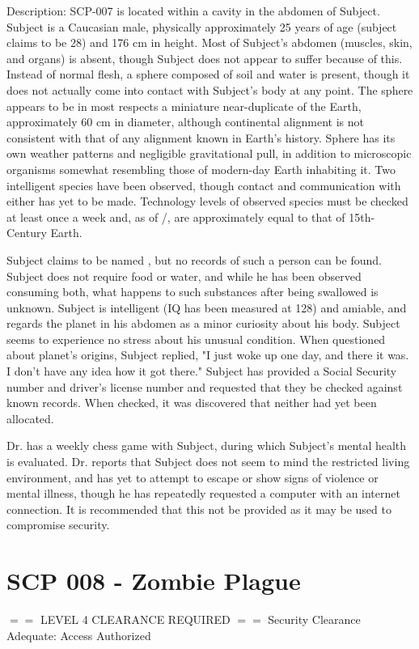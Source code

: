 \documentclass[a4paper, 11pt]{article}
\begin{document}
Description: SCP-007 is located within a cavity in the abdomen of Subject. Subject is a Caucasian male, physically approximately 25 years of age (subject claims to be 28) and 176 cm in height. Most of Subject's abdomen (muscles, skin, and organs) is absent, though Subject does not appear to suffer because of this. Instead of normal flesh, a sphere composed of soil and water is present, though it does not actually come into contact with Subject's body at any point. The sphere appears to be in most respects a miniature near-duplicate of the Earth, approximately 60 cm in diameter, although continental alignment is not consistent with that of any alignment known in Earth's history. Sphere has its own weather patterns and negligible gravitational pull, in addition to microscopic organisms somewhat resembling those of modern-day Earth inhabiting it. Two intelligent species have been observed, though contact and communication with either has yet to be made. Technology levels of observed species must be checked at least once a week and, as of /, are approximately equal to that of 15th-Century Earth.

Subject claims to be named , but no records of such a person can be found. Subject does not require food or water, and while he has been observed consuming both, what happens to such substances after being swallowed is unknown. Subject is intelligent (IQ has been measured at 128) and amiable, and regards the planet in his abdomen as a minor curiosity about his body. Subject seems to experience no stress about his unusual condition. When questioned about planet's origins, Subject replied, "I just woke up one day, and there it was. I don't have any idea how it got there." Subject has provided a Social Security number and driver's license number and requested that they be checked against known records. When checked, it was discovered that neither had yet been allocated.

Dr.  has a weekly chess game with Subject, during which Subject's mental health is evaluated. Dr.  reports that Subject does not seem to mind the restricted living environment, and has yet to attempt to escape or show signs of violence or mental illness, though he has repeatedly requested a computer with an internet connection. It is recommended that this not be provided as it may be used to compromise security.

\section{SCP 008 - Zombie Plague}
\begin{center}
$==$ LEVEL 4 CLEARANCE REQUIRED $==$\linebreak
Security Clearance Adequate: Access Authorized
\end{center}
\end{document}
